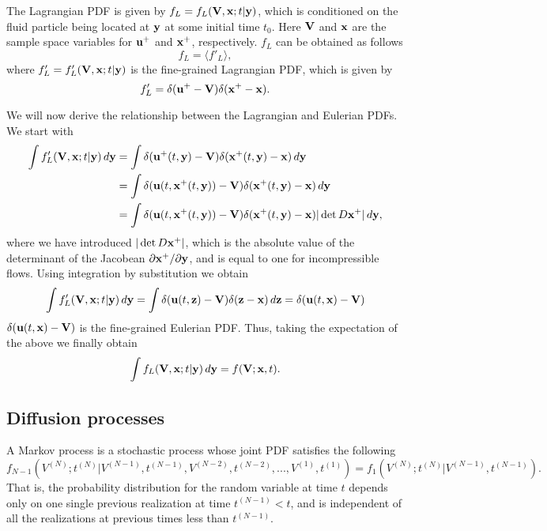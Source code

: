 \documentclass[oneside,a4paper,11pt]{report}
\begin{document}
The Lagrangian PDF is given by $f_L = f_L(\mathbf{V},\mathbf{x};t|\mathbf{y})$, which is conditioned on the fluid particle being located at $\mathbf{y}$ at some initial time $t_0$. Here $\mathbf{V}$ and $\mathbf{x}$ are the sample space variables for $\mathbf{u}^+$ and $\mathbf{x}^+$, respectively. $f_L$ can be obtained as follows 
\begin{equation}
f_L = \langle f'_L \rangle,
\end{equation}
where $f'_L = f'_L(\mathbf{V},\mathbf{x};t|\mathbf{y})$ is the fine-grained Lagrangian PDF, which is given by
\begin{equation}
f'_L = \delta(\mathbf{u}^+ - \mathbf{V}) \delta(\mathbf{x}^+ - \mathbf{x}).
\end{equation}

We will now derive the relationship between the Lagrangian and Eulerian PDFs. We start with
\begin{align}
\int f'_L(\mathbf{V},\mathbf{x};t|\mathbf{y}) \, d\mathbf{y} &= \int \delta(\mathbf{u}^+(t,\mathbf{y}) - \mathbf{V}) \delta(\mathbf{x}^+(t,\mathbf{y}) - \mathbf{x}) \, d\mathbf{y} \nonumber \\
&= \int \delta(\mathbf{u}(t,\mathbf{x}^+(t,\mathbf{y})) - \mathbf{V}) \delta(\mathbf{x}^+(t,\mathbf{y}) - \mathbf{x}) \, d\mathbf{y} \nonumber \\
&= \int \delta(\mathbf{u}(t,\mathbf{x}^+(t,\mathbf{y})) - \mathbf{V}) \delta(\mathbf{x}^+(t,\mathbf{y}) - \mathbf{x}) | \det D \mathbf{x}^+ | \, d\mathbf{y},
\end{align}
where we have introduced $| \det D \mathbf{x}^+ |$, which is the absolute value of the determinant of the Jacobean $\partial \mathbf{x}^+/\partial \mathbf{y}$, and is equal to one for incompressible flows. Using integration by substitution we obtain
\begin{equation}
\int f'_L(\mathbf{V},\mathbf{x};t|\mathbf{y}) \, d\mathbf{y} = \int \delta(\mathbf{u}(t,\mathbf{z}) - \mathbf{V}) \delta(\mathbf{z} - \mathbf{x}) \, d\mathbf{z} = \delta(\mathbf{u}(t,\mathbf{x}) - \mathbf{V})
\end{equation}
$\delta(\mathbf{u}(t,\mathbf{x}) - \mathbf{V})$ is the fine-grained Eulerian PDF. Thus, taking the expectation of the above we finally obtain
\begin{equation}
\label{eul_lag}
\int f_L(\mathbf{V},\mathbf{x};t|\mathbf{y}) \, d\mathbf{y} = f(\mathbf{V};\mathbf{x},t).
\end{equation}

\subsection{Diffusion processes}

A Markov process is a stochastic process whose joint PDF satisfies the following
\begin{equation}
f_{N-1}(V^{(N)};t^{(N)}| V^{(N-1)}, t^{(N-1)}, V^{(N-2)}, t^{(N-2)}, ... , V^{(1)}, t^{(1)}) = f_1(V^{(N)}; t^{(N)} | V^{(N-1)}, t^{(N-1)}). 
\end{equation}
That is, the probability distribution for the random variable at time $t$ depends only on one single previous realization at time $t^{(N-1)} < t$, and is independent of all the realizations at previous times less than $t^{(N-1)}$.
\end{document}
